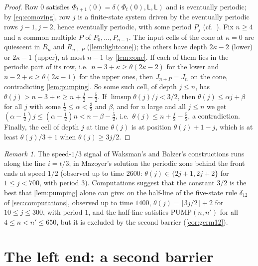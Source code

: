 \documentclass[3p]{elsarticle}
\theoremstyle{remark}
\newtheorem{remark}[theorem]{Remark}
\begin{document}
\begin{proof}
Row $0$ satisfies $\Phi_{t+1}(0)=\delta(\Phi_t(0),\mathsf L,\mathsf L)$ and is
eventually periodic; by \eqref{eq:comoving}, row $j$ is a finite-state system
driven by the eventually periodic rows $j-1,j-2$, hence eventually periodic,
with some period $P_j$ (cf.\ \cite[\S4]{MazoyerTerrier94}). Fix $n\ge4$ and a
common multiple $P$ of $P_0,\dots,P_{n-1}$. The input cells of the cone at
$\kappa=0$ are quiescent in $R_n$ and $R_{n+P}$ (\cref{lem:lightcone}); the
others have depth $2\kappa-2$ (lower) or $2\kappa-1$ (upper), at most $n-1$ by
\cref{lem:cone}. If each of them lies in the periodic part of its row, i.e.\
$n-3+\kappa\ge\theta(2\kappa-2)$ for the lower and $n-2+\kappa\ge\theta(2\kappa-1)$
for the upper ones, then $J_{n+P}=J_n$ on the cone, contradicting
\cref{lem:pumping}. So some such cell, of depth $j\le n$, has
$\theta(j)>n-3+\kappa\ge n+\frac{j}{2}-\frac52$. If
$\limsup\theta(j)/j<3/2$, then $\theta(j)\le\alpha j+\beta$ for all $j$ with some
$\tfrac12\le\alpha<\tfrac32$ and $\beta$, and for $n$ large and all $j\le n$ we
get $(\alpha-\tfrac12)j\le(\alpha-\tfrac12)n<n-\beta-\tfrac52$, i.e.\
$\theta(j)\le n+\tfrac j2-\tfrac52$, a contradiction. Finally, the cell of depth
$j$ at time $\theta(j)$ is at position $\theta(j)+1-j$, which is at least
$\theta(j)/3+1$ when $\theta(j)\ge 3j/2$.
\end{proof}

\begin{remark}\label{rem:optimal}
The speed-$1/3$ signal of Waksman's and Balzer's constructions runs along the
line $i=t/3$; in Mazoyer's solution the periodic zone behind the front ends at
speed $1/2$ (observed up to time $2600$: $\theta(j)\in\{2j+1,2j+2\}$ for
$1\le j<700$, with period $3$). Computations suggest that the constant $3/2$ is
the best that \cref{lem:pumping} alone can give: on the half-line of the
five-state rule $\delta_{12}$ of \cref{sec:computations}, observed up to time
$1400$, $\theta(j)=\lceil 3j/2\rceil+2$ for $10\le j\le300$, with period $1$,
and the half-line satisfies $\mathrm{PUMP}(n,n')$ for all $4\le n<n'\le650$,
but it is excluded by the second barrier (\cref{cor:germ12}).
\end{remark}

\section{The left end: a second barrier}\label{sec:left}
\end{document}
